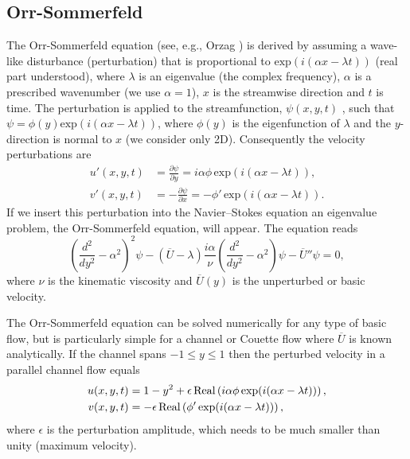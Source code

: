 \subsection{Orr-Sommerfeld}
\label{sec:mortensen:OS}
The Orr-Sommerfeld equation (see, e.g., Orzag \cite{orzag71}) is derived by assuming a wave-like disturbance (perturbation) that is proportional to $\text{exp}(i(\alpha x-\lambda t))$ (real part understood), where $\lambda$ is an eigenvalue (the complex frequency), $\alpha$ is a prescribed wavenumber (we use $\alpha=1$), $x$ is the streamwise direction and $t$ is time. The perturbation is applied to the streamfunction, $\psi(x,y,t)$ , such that $\psi=\phi(y) \text{exp}(i(\alpha x- \lambda t))$, where $\phi(y)$ is the eigenfunction of $\lambda$ and the $y$-direction is normal to $x$ (we consider only 2D). Consequently the velocity perturbations are
\begin{align}
 u'(x,y,t)&=\frac{\partial \psi}{\partial y}=i\alpha \phi \, \text{exp}(i(\alpha x- \lambda t)),\\
 v'(x,y,t)&=-\frac{\partial \psi}{\partial x}=-\phi' \, \text{exp}(i(\alpha x- \lambda t)).
\end{align}
If we insert this perturbation into the Navier--Stokes equation an eigenvalue problem, the Orr-Sommerfeld equation, will appear. The equation reads
\begin{equation}
 \left( \frac{d^2}{dy^2}-\alpha^2\right)^2\psi - \left(\overline{U}-\lambda \right) \frac{i \alpha}{\nu} \left( \frac{d^2}{dy^2}-\alpha^2\right)\psi - \overline{U}''\psi=0,
 \label{eq:mortensen:OrrS}
\end{equation}
where $\nu$ is the kinematic viscosity and $\overline{U}(y)$ is the unperturbed or basic velocity.

The Orr-Sommerfeld equation can be solved numerically for any type of basic flow, but is particularly simple for a channel or Couette flow where $\overline{U}$ is known analytically. If the channel spans $-1\leq y \leq 1$ then the perturbed velocity in a parallel channel flow equals
\begin{align}
 u(x,y,t)&=1-y^2+\epsilon \,\text{Real}\left(i\alpha \phi \, \text{exp}(i(\alpha x-\lambda t))\right), \notag \\
 v(x,y,t)&=-\epsilon \, \text{Real}\left(\phi' \, \text{exp}(i(\alpha x-\lambda t))\right),
\label{eq:mortensen:channel}
\end{align}
where $\epsilon$ is the perturbation amplitude, which needs to be much smaller than unity (maximum velocity).

